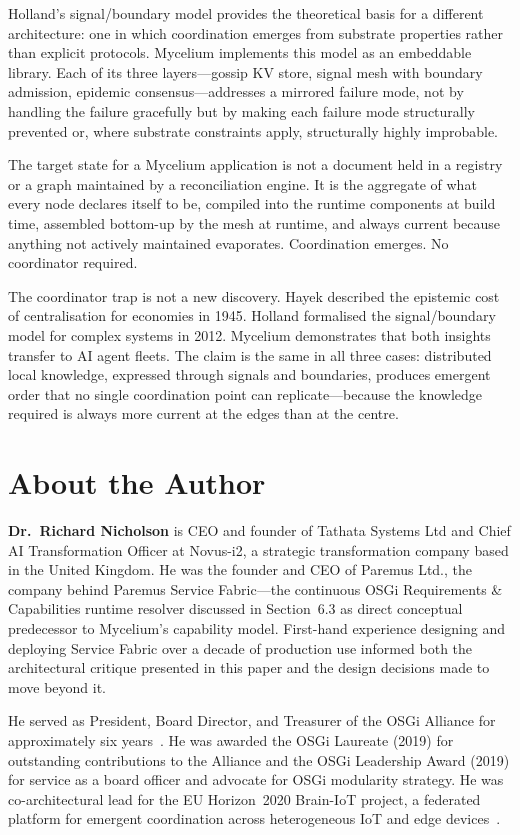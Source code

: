 \documentclass[11pt]{article}
\begin{document}
Holland's signal/boundary model provides the theoretical basis for a different
architecture: one in which coordination emerges from substrate properties rather
than explicit protocols. Mycelium implements this model as an embeddable library.
Each of its three layers---gossip KV store, signal mesh with boundary admission,
epidemic consensus---addresses a mirrored failure mode, not by handling the
failure gracefully but by making each failure mode structurally prevented or,
where substrate constraints apply, structurally highly improbable.

The target state for a Mycelium application is not a document held in a registry
or a graph maintained by a reconciliation engine. It is the aggregate of what
every node declares itself to be, compiled into the runtime components at build
time, assembled bottom-up by the mesh at runtime, and always current because
anything not actively maintained evaporates. Coordination emerges. No coordinator
required.

The coordinator trap is not a new discovery. Hayek described the epistemic cost
of centralisation for economies in 1945. Holland formalised the signal/boundary
model for complex systems in 2012. Mycelium demonstrates that both insights
transfer to AI agent fleets. The claim is the same in all three cases:
distributed local knowledge, expressed through signals and boundaries, produces
emergent order that no single coordination point can replicate---because the
knowledge required is always more current at the edges than at the centre.



\section*{About the Author}

\textbf{Dr.\ Richard Nicholson} is CEO and founder of Tathata Systems Ltd and
Chief AI Transformation Officer at Novus-i2, a strategic transformation company
based in the United Kingdom. He was the founder and CEO of Paremus Ltd., the
company behind Paremus Service Fabric---the continuous OSGi Requirements \&
Capabilities runtime resolver discussed in Section~6.3 as direct conceptual
predecessor to Mycelium's capability model. First-hand experience designing and
deploying Service Fabric over a decade of production use informed both the
architectural critique presented in this paper and the design decisions made to
move beyond it.

He served as President, Board Director, and Treasurer of the OSGi Alliance for
approximately six years~\cite{osgi-mod,osgi-cmb}. He was awarded the OSGi Laureate
(2019) for outstanding contributions to the Alliance and the OSGi Leadership Award
(2019) for service as a board officer and advocate for OSGi modularity strategy.
He was co-architectural lead for the EU Horizon~2020 Brain-IoT project, a
federated platform for emergent coordination across heterogeneous IoT and edge
devices~\cite{brain-iot-1,brain-iot-2}.
\end{document}
